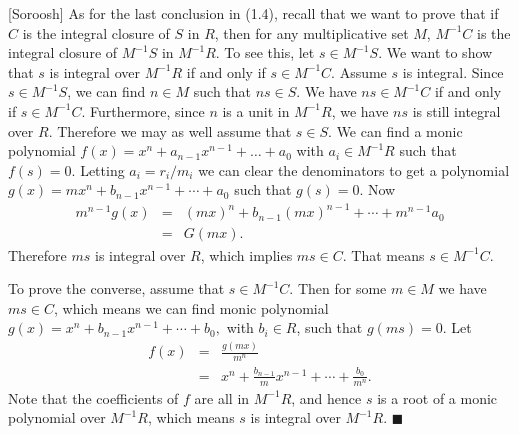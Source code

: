\documentclass{article}
\makeatletter
\newcommand\<{\triangleleft}
\newenvironment{solution}[1]{\def\x{#1}\begin{trivlist}\item[]\hspace*{-.5em}[\x]}
                {\hspace*{\fill} $\blacksquare$
                \protected@write0{}{\currentEx, \x}
                \end{trivlist}}
\makeatother
\begin{document}
\begin{solution}{Soroosh}
    As for the last conclusion in (1.4), recall that we want to prove
    that if $C$ is the integral closure of $S$ in $R$, then for any
    multiplicative set $M$, $M^{-1}C$ is the integral closure of $M^{-1}S$
    in $M^{-1}R$. To see this, let $s \in M^{-1}S$. We want
    to show that $s$ is integral over $M^{-1}R$ if and only
    if $s\in M^{-1}C$. Assume $s$ is integral.
    Since $s \in M^{-1}S$, we can find $n\in M$ such that $ns \in S$.
    We have $ns \in M^{-1}C$ if and only if $s \in M^{-1}C$. Furthermore,
    since $n$ is a unit in $M^{-1}R$, we have $ns$ is still integral
    over $R$. Therefore we may as well assume that $s \in S$.
    We can find a monic polynomial
    $f(x)=x^n+a_{n-1}x^{n-1}+\dots+a_0$ with $a_i \in M^{-1}R$ such
    that $f(s)=0$. Letting $a_i=r_i/m_i$ we can clear the denominators
    to get a polynomial
    $g(x)=mx^n+b_{n-1}x^{n-1}+\cdots+a_0$ such that $g(s)=0$.
    Now
    \begin{eqnarray*}
        m^{n-1}g(x)&=& (mx)^n+b_{n-1}(mx)^{n-1}+\cdots+m^{n-1}a_0 \\
        &=& G(mx).
    \end{eqnarray*}
    Therefore $ms$ is integral over $R$, which implies $ms \in C$.
    That means $s \in M^{-1}C.$

    To prove the converse, assume that $s \in M^{-1}C$. Then for some
    $m \in M$ we have $ms \in C$, which means we can find monic
    polynomial $g(x)=x^n+b_{n-1}x^{n-1}+\cdots+b_0,$ with $b_i \in R$,
    such that $g(ms)=0$. Let
    \begin{eqnarray*}
        f(x)&=& \frac{g(mx)}{m^n} \\
        &=& x^n+\frac{b_{n-1}}{m}x^{n-1}+\cdots+\frac{b_0}{m^n}.
    \end{eqnarray*}
    Note that the coefficients of $f$ are all in $M^{-1}R$, and hence
    $s$ is a root of a monic polynomial over $M^{-1}R$, which means
    $s$ is integral over $M^{-1}R$.
 \end{solution}
\end{document}
